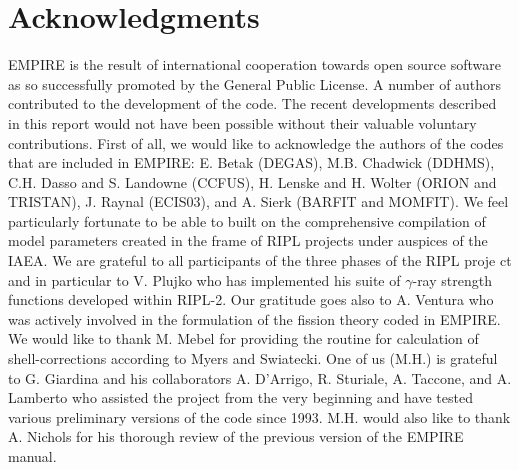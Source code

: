 \documentclass[twocolumn,amsmath,amssymb,10pt,groupedaddress,a4paper]{revtex4}
\begin{document}
\section*{Acknowledgments}
EMPIRE is the result of international cooperation towards open source software as so successfully promoted by the General Public License. A number of authors contributed to the development of the code. The recent developments described in this report would not have been possible without their valuable voluntary contributions. First of all, we would like to acknowledge the authors of the codes that are included in EMPIRE: E. Betak (DEGAS), M.B. Chadwick (DDHMS), C.H. Dasso and S. Landowne (CCFUS), H. Lenske and H. Wolter (ORION and TRISTAN), J. Raynal (ECIS03), and A. Sierk (BARFIT and MOMFIT). We feel particularly fortunate to be able to built on the comprehensive compilation of model parameters created in the frame of RIPL projects under auspices of the IAEA. We are grateful to all participants of the three phases of the RIPL proje ct and in particular to V. Plujko who has implemented his suite of $\gamma$-ray strength functions developed within RIPL-2. Our gratitude goes also to A. Ventura who was actively involved in the formulation of the fission theory coded in EMPIRE. We would like to thank M. Mebel for providing the routine for calculation of shell-corrections according to Myers and Swiatecki. One of us (M.H.) is grateful to G. Giardina and his collaborators A. D'Arrigo, R. Sturiale, A. Taccone, and A. Lamberto who assisted the project from the very beginning and have tested various preliminary versions of the code since 1993. M.H. would also like to thank A. Nichols for his thorough review of the previous version of the EMPIRE manual.

\end{document}

